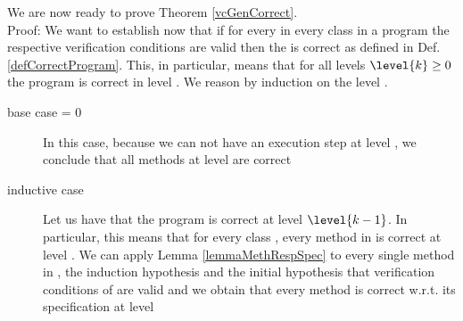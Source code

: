 We are now ready to prove Theorem \ref{vcGenCorrect}.\\
Proof:
We want to establish now  that if for every \methodd{}
 in every class \class{} in a program \Program{}  the respective verification conditions are valid then 
the \Program{} is correct as defined in Def. \ref{defCorrectProgram}.
 This, in particular, means that for all levels $\level{k} \ge 0 $ the program is correct in  level .
We reason by induction on the level . 
\begin{description} 
\item[base case  = 0]
 In this case, because we can not have an execution step at level , we conclude that all methods at level  
are correct
\item[inductive case ] Let us have that the program is correct at level $\level{k-1}$. 
In particular, this means that for every class \class{}, every method \methodd{} in \class{} is correct at level .
We can apply Lemma \ref{lemmaMethRespSpec} to every single method  \methodd{} in \Program{}, 
 the induction hypothesis  and the initial hypothesis that  verification conditions  of \methodd{} are valid and we obtain that 
every method  \methodd{} is correct w.r.t. its specification at level  


\end{description}
\Qed







